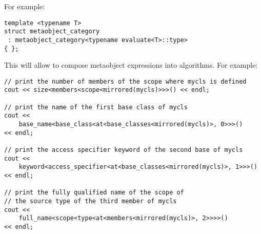 For example:

\begin{verbatim}
template <typename T>
struct metaobject_category
 : metaobject_category<typename evaluate<T>::type>
{ };
\end{verbatim}

This will allow to compose metaobject expressions into algorithms. For example:

\begin{verbatim}
// print the number of members of the scope where mycls is defined
cout << size<members<scope<mirrored(mycls)>>>() << endl;

// print the name of the first base class of mycls
cout <<
	base_name<base_class<at<base_classes<mirrored(mycls)>, 0>>>()
<< endl;

// print the access specifier keyword of the second base of mycls
cout <<
	keyword<access_specifier<at<base_classes<mirrored(mycls)>, 1>>>()
<< endl;

// print the fully qualified name of the scope of
// the source type of the third member of mycls
cout <<
	full_name<scope<type<at<members<mirrored(mycls)>, 2>>>>()
<< endl;
\end{verbatim}


